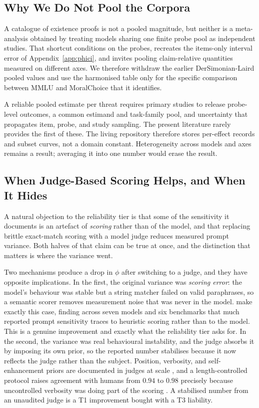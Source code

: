 \documentclass[11pt]{article}
\begin{document}
\subsection{Why We Do Not Pool the Corpora}
\label{app:pooled}

A catalogue of existence proofs is not a pooled magnitude, but neither is a
meta-analysis obtained by treating models sharing one finite probe pool as
independent studies. That shortcut conditions on the probes, recreates the
items-only interval error of Appendix~\ref{app:phici}, and invites pooling
claim-relative quantities measured on different axes. We therefore withdraw the
earlier DerSimonian-Laird pooled values and use the harmonised table only for the
specific comparison between MMLU and MoralChoice that it identifies.

A reliable pooled estimate per threat requires primary studies to release
probe-level outcomes, a common estimand and task-family pool, and uncertainty
that propagates item, probe, and study sampling. The present literature rarely
provides the first of these. The living repository therefore stores per-effect
records and subset curves, not a domain constant. Heterogeneity across models and
axes remains a result; averaging it into one number would erase the result.

\subsection{When Judge-Based Scoring Helps, and When It Hides}
\label{app:judgescoring}

A natural objection to the reliability tier is that some of the sensitivity it
documents is an artefact of \emph{scoring} rather than of the model, and that
replacing brittle exact-match scoring with a model judge reduces measured
prompt variance. Both halves of that claim can be true at once, and the
distinction that matters is where the variance went.

Two mechanisms produce a drop in $\phi$ after switching to a judge, and they
have opposite implications. In the first, the original variance was \emph{scoring error}: the model's behaviour was stable but a string matcher failed on valid paraphrases, so a semantic scorer removes measurement noise that was never in the model. \citet{hua2025flaw} make exactly this case, finding across seven models and six benchmarks that much reported prompt sensitivity traces to heuristic scoring rather than to the model. This is a genuine improvement and exactly what the
reliability tier asks for. In the second, the variance was real behavioural
instability, and the judge absorbs it by imposing its own prior, so the reported
number stabilises because it now reflects the judge rather than the subject.
Position, verbosity, and self-enhancement priors are documented in judges at
scale \cite{ye2024justice,wang2024fair,zhou2026judgebias}, and a length-controlled
protocol raises agreement with humans from $0.94$ to $0.98$ precisely because
uncontrolled verbosity was doing part of the scoring
\cite{dubois2024lengthcontrolled}. A stabilised number from an unaudited judge
is a T1 improvement bought with a T3 liability.
\end{document}
